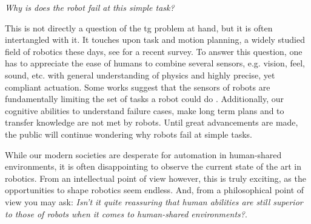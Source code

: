 \textit{Why is does the robot fail at this simple task?}

This is not directly a question of the \ac{tg} problem at
hand, but it is often intertangled with it. It touches upon
task and motion planning, a widely studied field of robotics
these days, see \cite{garrett2021integrated} for a recent
survey. To answer this question, one has to appreciate the
ease of humans to combine several sensors, e.g. vision,
feel, sound, etc. with general understanding of physics and
highly precise, yet compliant actuation. Some works suggest
that the sensors of robots are fundamentally limiting the set of
tasks a robot could do \cite{majumdar2023fundamental}.
Additionally, our cognitive abilities to understand failure
cases, make long term plans and to transfer knowledge are
not met by robots. Until great advancements are made, the
public will continue wondering why robots fail at simple
tasks.

While our modern societies are desperate for automation in human-shared
environments, it is often disappointing to observe the current state of the art
in robotics. From an intellectual point of view however, this is truly exciting,
as the opportunities to shape robotics seem endless. And, from a philosophical
point of view you may ask: \textit{Isn't it quite reassuring that human
abilities are still superior to those of robots when it
comes to human-shared environments?}.
